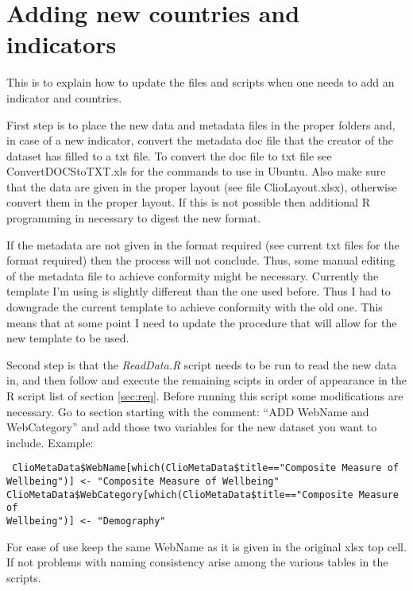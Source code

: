 \documentclass[a4paper]{article}
\begin{document}
\section{Adding new countries and indicators}

This is to explain how to update the files and scripts when one needs to add an 
indicator and countries.

First step is to place the new data and metadata files in the proper folders 
and, in case of a new indicator, convert the metadata doc file that the creator 
of the dataset has filled to a txt file. To convert the doc file to txt file 
see ConvertDOCStoTXT.xls for the commands to use in Ubuntu. Also make sure that 
the data are given in the proper layout (see file ClioLayout.xlsx), otherwise 
convert them in the proper layout. If this is not possible then additional R 
programming in necessary to digest the new format.

If the metadata are not given in the format required (see current txt files for 
the format required) then the process will not conclude. Thus, some manual 
editing of the metadata file to achieve conformity might be necessary. 
Currently the template I'm using is slightly different than the one used 
before. Thus I had to downgrade the current template to achieve conformity with 
the old one. This means that at some point I need to update the procedure that 
will allow for the new template to be used.

Second step is that the \textit{ReadData.R} script needs to be run to read the 
new data in, and then follow and execute the remaining scipts in order of 
appearance in the R script list of section \ref{sec:req}. Before running this 
script some modifications are necessary. Go to section starting with the 
comment: ``ADD WebName and WebCategory'' and add those two variables for the 
new dataset you want to include. Example:
\begin{verbatim}
 ClioMetaData$WebName[which(ClioMetaData$title=="Composite Measure of 
Wellbeing")] <- "Composite Measure of Wellbeing"
ClioMetaData$WebCategory[which(ClioMetaData$title=="Composite Measure of 
Wellbeing")] <- "Demography"
\end{verbatim}

For ease of use keep the same WebName as it is given in the original xlsx top 
cell. If not problems with naming consistency arise among the various tables in 
the scripts.
\end{document}
